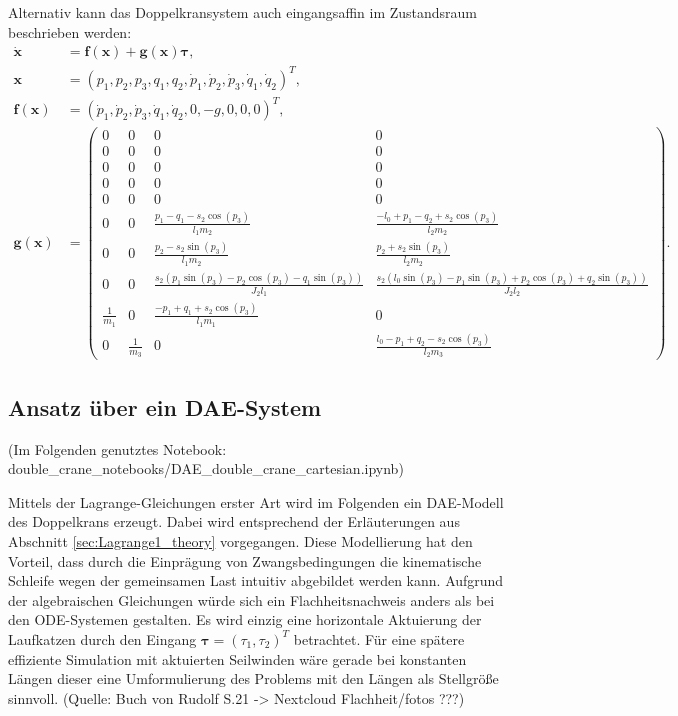 Alternativ kann das Doppelkransystem auch eingangsaffin im Zustandsraum beschrieben werden:
\begin{align}
	\dot{\mathbf{x}} &= \mathbf{f}(\mathbf{x}) + \mathbf{g}(\mathbf{x}) \mathbf{\tau}, \nonumber \\ \mathbf{x} &= (p_{1},	p_{2}, p_{3}, q_{1}, q_{2}, \dot{p}_{1}, \dot{p}_{2}, \dot{p}_{3}, \dot{q}_{1}, \dot{q}_{2})^T, \nonumber \\
	\mathbf{f}(\mathbf{x}) &= 
	(\dot{p}_{1}, \dot{p}_{2}, \dot{p}_{3}, \dot{q}_{1}, \dot{q}_{2}, 0, -g, 0, 0, 0)^T, \nonumber \\ 
	\mathbf{g}(\mathbf{x}) &=
	\left(\begin{matrix}
		0 & 0 & 0 & 0\\
		0 & 0 & 0 & 0\\
		0 & 0 & 0 & 0\\
		0 & 0 & 0 & 0\\
		0 & 0 & 0 & 0\\
		0 & 0 & \frac{p_{1} - q_{1} - s_{2} \cos{\left(p_{3} \right)}}{l_{1} m_{2}} & \frac{- l_{0} + p_{1} - q_{2} + s_{2} \cos{\left(p_{3} \right)}}{l_{2} m_{2}}\\
		0 & 0 & \frac{p_{2} - s_{2} \sin{\left(p_{3} \right)}}{l_{1} m_{2}} & \frac{p_{2} + s_{2} \sin{\left(p_{3} \right)}}{l_{2} m_{2}}\\
		0 & 0 & \frac{s_{2} \left(p_{1} \sin{\left(p_{3} \right)} - p_{2} \cos{\left(p_{3} \right)} - q_{1} \sin{\left(p_{3} \right)}\right)}{J_{2} l_{1}} & \frac{s_{2} \left(l_{0} \sin{\left(p_{3} \right)} - p_{1} \sin{\left(p_{3} \right)} + p_{2} \cos{\left(p_{3} \right)} + q_{2} \sin{\left(p_{3} \right)}\right)}{J_{2} l_{2}}\\
		\frac{1}{m_{1}} & 0 & \frac{- p_{1} + q_{1} + s_{2} \cos{\left(p_{3} \right)}}{l_{1} m_{1}} & 0\\
		0 & \frac{1}{m_{3}} & 0 & \frac{l_{0} - p_{1} + q_{2} - s_{2} \cos{\left(p_{3} \right)}}{l_{2} m_{3}}
	\end{matrix}\right).
\end{align}

\subsection{Ansatz über ein DAE-System}
(Im Folgenden genutztes Notebook: double\_crane\_notebooks/DAE\_double\_crane\_cartesian.ipynb)

Mittels der Lagrange-Gleichungen erster Art wird im Folgenden ein DAE-Modell des Doppelkrans erzeugt. Dabei wird entsprechend der Erläuterungen aus Abschnitt \ref{sec:Lagrange1_theory} vorgegangen. Diese Modellierung hat den Vorteil, dass durch die Einprägung von Zwangsbedingungen die kinematische Schleife wegen der gemeinsamen Last intuitiv abgebildet werden kann. Aufgrund der algebraischen Gleichungen würde sich ein Flachheitsnachweis anders als bei den ODE-Systemen gestalten. Es wird einzig eine horizontale Aktuierung der Laufkatzen durch den Eingang $\mathbf{\tau} = (\tau_{1}, \tau_{2})^T$ betrachtet. Für eine spätere effiziente Simulation mit aktuierten Seilwinden wäre gerade bei konstanten Längen dieser eine Umformulierung des Problems mit den Längen als Stellgröße sinnvoll. (Quelle: Buch von Rudolf S.21 -> Nextcloud Flachheit/fotos ???)

